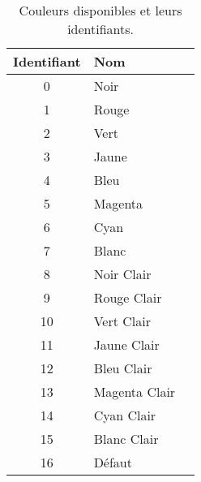 \documentclass[french, 12pt]{article}
\begin{document}
\renewcommand{\arraystretch}{1.1}
\begin{table}[htp]
      \begin{center}
            \begin{tabular}{clp{1.5em}}
                  \toprule
                  Identifiant & Nom           &                            \\
                  \midrule
                  0           & Noir          & \cellcolor{black}          \\
                  1           & Rouge         & \cellcolor{red}            \\
                  2           & Vert          & \cellcolor{green}          \\
                  3           & Jaune         & \cellcolor{yellow}         \\
                  4           & Bleu          & \cellcolor{blue}           \\
                  5           & Magenta       & \cellcolor{magenta}        \\
                  6           & Cyan          & \cellcolor{cyan}           \\
                  7           & Blanc         & \cellcolor{white}          \\
                  8           & Noir Clair    & \cellcolor{bright_black}   \\
                  9           & Rouge Clair   & \cellcolor{bright_red}     \\
                  10          & Vert Clair    & \cellcolor{bright_green}   \\
                  11          & Jaune Clair   & \cellcolor{bright_yellow}  \\
                  12          & Bleu Clair    & \cellcolor{bright_blue}    \\
                  13          & Magenta Clair & \cellcolor{bright_magenta} \\
                  14          & Cyan Clair    & \cellcolor{bright_cyan}    \\
                  15          & Blanc Clair   & \cellcolor{bright_white}   \\
                  16          & Défaut        &                            \\
                  \bottomrule
            \end{tabular}
      \end{center}
      \caption{Couleurs disponibles et leurs identifiants.}
      \label{tbl:color}
\end{table}
\end{document}
